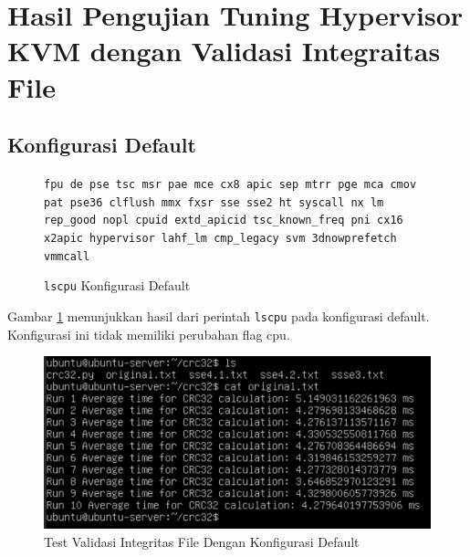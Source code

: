 \section{Hasil Pengujian Tuning Hypervisor KVM dengan Validasi Integraitas File}

\subsection{Konfigurasi Default}
\begin{figure}
    \texttt{fpu de pse tsc msr pae mce cx8 apic sep mtrr pge mca cmov pat pse36 clflush mmx fxsr sse sse2 ht syscall nx lm rep\_good nopl cpuid extd\_apicid tsc\_known\_freq pni cx16 x2apic hypervisor lahf\_lm cmp\_legacy svm 3dnowprefetch vmmcall}
    \caption{\texttt{lscpu} Konfigurasi Default}
    \label{fig:lscpu_file_integrity_test_default}
\end{figure}

Gambar \ref{fig:lscpu_file_integrity_test_default} menunjukkan hasil dari perintah \texttt{lscpu} pada konfigurasi default. Konfigurasi ini tidak memiliki perubahan flag cpu.

\begin{figure}
    \centering
    \includegraphics[width=1\textwidth]
    {assets/pics/crc-test/original.jpeg}
    \caption{Test Validasi Integritas File Dengan Konfigurasi Default}
    \label{fig:file_integrity_test_default}
\end{figure}

